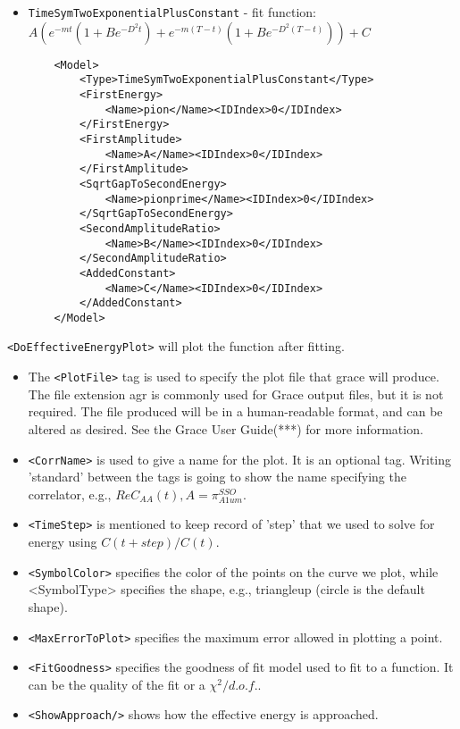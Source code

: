 \documentclass[12pt]{article}
\newcommand{\vb}{\texttt}
\begin{document}
\begin{itemize}
\item \vb{TimeSymTwoExponentialPlusConstant} - fit function: $A(e^{-mt}(1 + B e^{-D^2t} ) + e^{-m(T-t)}(1 + B e^{-D^2(T-t)})) + C$
\begin{verbatim}
    <Model>
        <Type>TimeSymTwoExponentialPlusConstant</Type>
        <FirstEnergy>
            <Name>pion</Name><IDIndex>0</IDIndex>
        </FirstEnergy>
        <FirstAmplitude>
            <Name>A</Name><IDIndex>0</IDIndex>
        </FirstAmplitude>
        <SqrtGapToSecondEnergy>
            <Name>pionprime</Name><IDIndex>0</IDIndex>
        </SqrtGapToSecondEnergy>
        <SecondAmplitudeRatio>
            <Name>B</Name><IDIndex>0</IDIndex>
        </SecondAmplitudeRatio>
        <AddedConstant>
            <Name>C</Name><IDIndex>0</IDIndex>
        </AddedConstant>
    </Model>
\end{verbatim}
\end{itemize}

\vb{<DoEffectiveEnergyPlot>} will plot the function after fitting.

\begin{itemize}
\item The \vb{<PlotFile>} tag is used to specify the plot file that grace will produce. The file extension agr is commonly used for Grace output files, but it is not required. The file produced will be in a human-readable format, and can be altered as desired. See the Grace User Guide(***) for more information.

\item \vb{<CorrName>} is used to give a name for the plot. It is an optional tag. Writing 'standard' between the tags is going to show the name specifying the correlator, e.g., $Re C_{AA}(t), A = \pi_{A1um}^{SSO}$.

\item \vb{<TimeStep>} is mentioned to keep record of 'step' that we used to solve for energy using $C(t+step)/C(t)$.

\item \vb{<SymbolColor>} specifies the color of the points on the curve we plot, while <SymbolType> specifies the shape, e.g., triangleup (circle is the default shape).

\item \vb{<MaxErrorToPlot>} specifies the maximum error allowed in plotting a point.

\item \vb{<FitGoodness>} specifies the goodness of fit model used to fit to a function. It can be the
quality of the fit or a $\chi^2/d.o.f.$. 

\item \vb{<ShowApproach/>} shows how the effective energy is approached.
\end{itemize}
\end{document}
